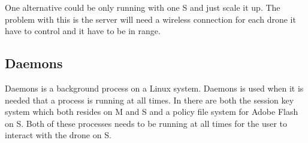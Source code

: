 One alternative could be only running with one S and just scale it up. The problem with this is the server will need a wireless connection for each drone it have to control and it have to be in range.

\subsection{Daemons}

Daemons is a background process on a Linux system.
Daemons is used when it is needed that a process is running at all times. In \projectname{} there are both the session key system which both resides on M and S and a policy file system for Adobe Flash on S. Both of these processes needs to be running at all times for the user to interact with the drone on S.

